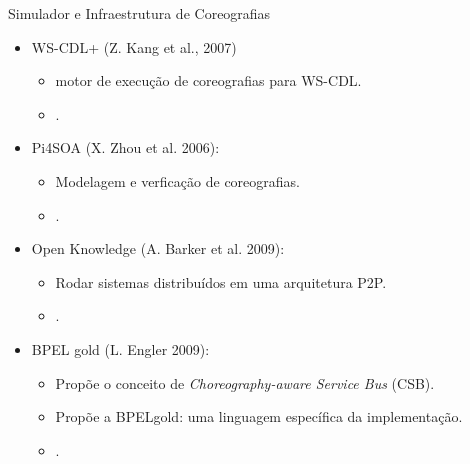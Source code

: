 \documentclass[xcolor=svgnames]{beamer}
\begin{document}
  \begin{frame}{ Simulador e Infraestrutura de Coreografias }
      \begin{itemize}
	\item <1-> WS-CDL+ (Z. Kang et al., 2007) 
	    \begin{itemize}
	      \item motor de execução de coreografias para WS-CDL.
	      \item \color{red}{É apenas um protótipo}.
	    \end{itemize}
	
	\item <2-> Pi4SOA (X. Zhou et al. 2006):
	    \begin{itemize}
	      \item Modelagem e verficação de coreografias. 
	      \item \color{red}{Foco na modelagem e simulações para verificar inconsistencias na especificação}.
	    \end{itemize}

	\item <3-> Open Knowledge (A. Barker et al. 2009):
	    \begin{itemize}
	      \item Rodar sistemas distribuídos em uma arquitetura P2P. 
	      \item \color{red}{Roda coreografias de maneira limitada por conta do LCC}.%
	    \end{itemize}

	\item <3-> BPEL gold (L. Engler 2009):
	    \begin{itemize}
	      \item Propõe o conceito de \textit{Choreography-aware Service Bus} (CSB). 
	      \item Propõe a BPELgold: uma linguagem específica da implementação.
	      \item \color{red}{A implementação  é um protótipo}.%
	    \end{itemize}  
     \end{itemize}

  \end{frame}
\end{document}
